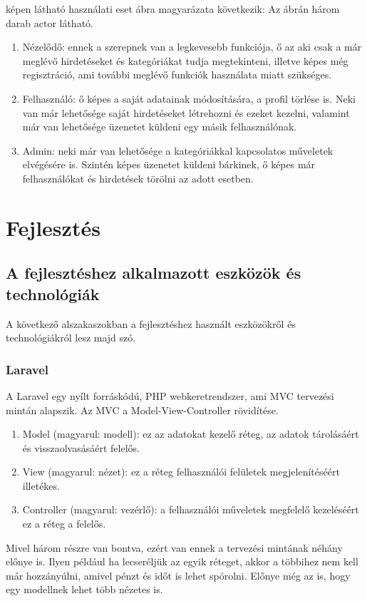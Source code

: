 \documentclass[]{thesis-ekf}
\theoremstyle{definition}
\theoremstyle{remark}
\begin{document}
	 képen látható használati eset ábra magyarázata következik:
	Az ábrán három darab actor látható.
	\begin{enumerate}
		\item Nézelődő: ennek a szerepnek van a legkevesebb funkciója, ő az aki csak a már meglévő hirdetéseket és kategóriákat tudja megtekinteni, illetve képes még regisztráció, ami további meglévő funkciók használata miatt szükséges.
		\item Felhasználó: ő képes a saját adatainak módosítására, a profil törlése is. Neki van már lehetősége saját hirdetéseket létrehozni és ezeket kezelni, valamint már van lehetősége üzenetet küldeni egy másik felhasználónak.
		\item Admin: neki már van lehetősége a kategóriákkal kapcsolatos műveletek elvégésére is. Szintén képes üzenetet küldeni bárkinek, ő képes már felhasználókat és hirdetések törölni az adott esetben.
	\end{enumerate}	

	\chapter{Fejlesztés}		
	\section{A fejlesztéshez alkalmazott eszközök és technológiák}
		A következő alszakaszokban a fejlesztéshez használt eszközökről és technológiákról lesz majd szó.
	\subsection{Laravel}\label{sc-laravel}
		A Laravel egy nyílt forráskódú, PHP webkeretrendszer, ami MVC tervezési mintán alapszik. Az MVC a Model-View-Controller rövidítése.
		\begin{enumerate}
			\item Model (magyarul: modell): ez az adatokat kezelő réteg, az adatok tárolásáért és visszaolvasásáért felelős.
			\item View (magyarul: nézet): ez a réteg felhasználói felületek megjelenítéséért illetékes. 
			\item Controller (magyarul: vezérlő): a felhasználói műveletek megfelelő kezeléséért ez a réteg a felelős.
		\end{enumerate}
		Mivel három részre van bontva, ezért van ennek a tervezési mintának néhány előnye is. Ilyen például ha lecseréljük az egyik réteget, akkor a többihez nem kell már hozzányúlni, amivel pénzt és időt is lehet spórolni. Előnye még az is, hogy egy modellnek lehet több nézetes is.
		\cite[102-103.~oldal]{Kusper}
\end{document}
